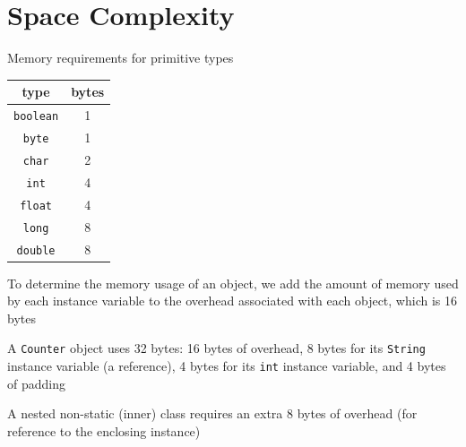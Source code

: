\documentclass[8pt,a4paper,compress]{beamer}
\begin{document}
\section{Space Complexity}
\begin{frame}[fragile]
\pause

Memory requirements for primitive types
\begin{center}
\begin{tabular}{cc}
type & bytes \\ \hline
\lstinline$boolean$ & 1 \\
\lstinline$byte$ & 1 \\
\lstinline$char$ & 2 \\
\lstinline$int$ & 4 \\
\lstinline$float$ & 4 \\
\lstinline$long$ & 8 \\
\lstinline$double$ & 8
\end{tabular} 
\end{center}

\pause
\bigskip

To determine the memory usage of an object, we add the amount of memory used by each instance variable to the overhead associated with each object, which is 16 bytes

\pause
\bigskip

A \lstinline{Counter} object uses 32 bytes: 16 bytes of overhead, 8 bytes for its \lstinline{String} instance variable (a reference), 4 bytes for its \lstinline{int} instance variable, and 4 bytes of padding

\pause
\bigskip

A nested non-static (inner) class requires an extra 8 bytes of overhead (for reference to the enclosing instance)
\end{frame}
\end{document}

